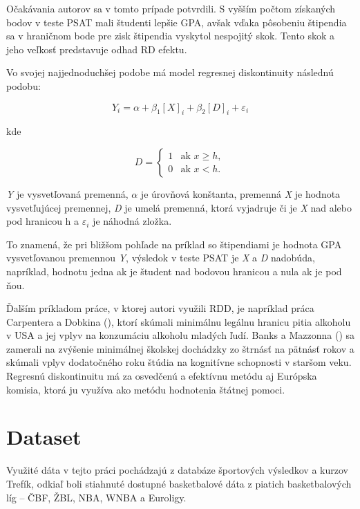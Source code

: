 \documentclass[
  digital, %
  oneside, %
  notable,   %
  lof,     %
  lot,     %
]{fithesis3}
\begin{document}
		Očakávania autorov sa v tomto prípade potvrdili. S vyšším počtom získaných bodov  v teste PSAT mali študenti lepšie GPA, avšak vďaka pôsobeniu štipendia sa v hraničnom bode pre zisk štipendia vyskytol nespojitý skok. Tento skok a jeho veľkosť predstavuje odhad RD efektu.
		
		Vo svojej najjednoduchšej podobe má model regresnej diskontinuity následnú podobu:
		
		\begin{equation}
		Y_{i} = \alpha + \beta _{1} [\textit{X}]_{i} + \beta _{2} [\textit{D}]_{i} + \varepsilon_{i}
		\end{equation}
		
		kde 
		
		 \begin{equation}
		D = \begin{cases}
		1 & \text{ak }x\geq{h}, \\
		0 & \text{ak }x < {h}.
		\end{cases}
		\end{equation}
		
		\textit{Y} je vysvetľovaná premenná, $\alpha$ je úrovňová konštanta, premenná \textit{X} je hodnota vysvetľujúcej premennej, \textit{D} je umelá premenná, ktorá vyjadruje či je \textit{X} nad alebo pod hranicou h a $\varepsilon_{i}$ je náhodná zložka. 
		
		To znamená, že pri bližšom pohľade na príklad so štipendiami je hodnota GPA vysvetľovanou premennou \textit{Y}, výsledok v teste PSAT je \textit{X} a \textit{D} nadobúda, napríklad, hodnotu jedna ak je študent nad bodovou hranicou a nula ak je pod ňou.
	
		Ďalším príkladom práce, v ktorej autori využili RDD, je napríklad práca Carpentera a Dobkina (\citeyear{carpenter2011}), ktorí skúmali minimálnu legálnu hranicu pitia alkoholu v USA a jej vplyv na konzumáciu alkoholu mladých ľudí. Banks a Mazzonna (\citeyear{banks2012}) sa zamerali na zvýšenie minimálnej školskej dochádzky zo štrnásť na pätnásť rokov a skúmali vplyv dodatočného roku štúdia na kognitívne schopnosti v staršom veku. Regresnú diskontinuitu má za osvedčenú a efektívnu metódu aj Európska komisia, ktorá ju využíva ako metódu hodnotenia štátnej pomoci. \parencite[s.~20]{ek2014} 
		
		\section{Dataset}
		Využité dáta v tejto práci pochádzajú z databáze športových výsledkov a kurzov Trefík, odkiaľ boli stiahnuté dostupné basketbalové dáta z piatich basketbalových líg – ČBF, ŽBL, NBA, WNBA a Euroligy. \parencite{trefik}
		
\end{document}
